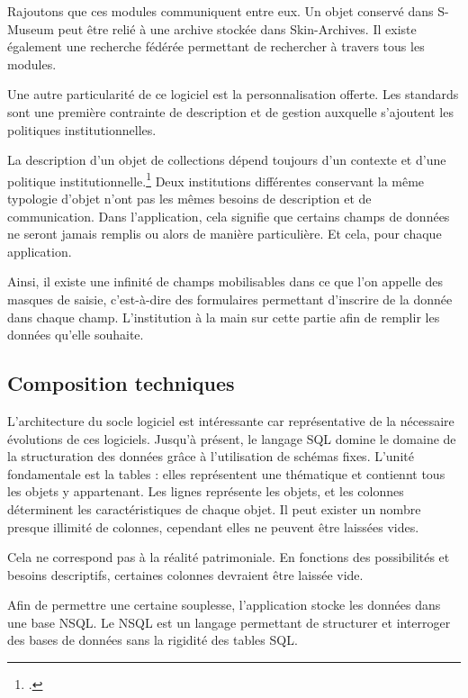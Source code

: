 Rajoutons que ces modules communiquent entre eux. Un objet conservé dans S-Museum peut être relié à une archive stockée dans Skin-Archives. Il existe également une recherche fédérée permettant de rechercher à travers tous les modules.

Une autre particularité de ce logiciel est la personnalisation offerte. Les standards sont une première contrainte de description et de gestion auxquelle s'ajoutent les politiques institutionnelles.

La description d'un objet de collections dépend toujours d'un contexte et d'une politique institutionnelle.\footcites{flinnWhoseMemoriesWhose2009}{cookEvidenceMemoryIdentity2012} Deux institutions différentes conservant la même typologie d'objet n'ont pas les mêmes besoins de description et de communication. Dans l'application, cela signifie que certains champs de données ne seront jamais remplis ou alors de manière particulière. Et cela, pour chaque application.

Ainsi, il existe une infinité de champs mobilisables dans ce que l'on appelle des masques de saisie, c'est-à-dire des formulaires permettant d'inscrire de la donnée dans chaque champ. L'institution à la main sur cette partie afin de remplir les données qu'elle souhaite.

\subsection{Composition techniques}

L'architecture du socle logiciel est intéressante car représentative de la nécessaire évolutions de ces logiciels. Jusqu'à présent, le langage SQL domine le domaine de la structuration des données grâce à l'utilisation de schémas fixes. L'unité fondamentale est la \glspl{table} : elles représentent une thématique et contiennt tous les objets y appartenant. Les lignes représente les objets, et les colonnes déterminent les caractéristiques de chaque objet. Il peut exister un nombre presque illimité de colonnes, cependant elles ne peuvent être laissées vides. 

Cela ne correspond pas à la réalité patrimoniale. En fonctions des possibilités et besoins descriptifs, certaines colonnes devraient être laissée vide.\newline

Afin de permettre une certaine souplesse, l'application stocke les données dans une base \gls{NSQL}. Le \gls{NSQL} est un langage permettant de structurer et interroger des bases de données sans la rigidité des \glspl{table} SQL. 

